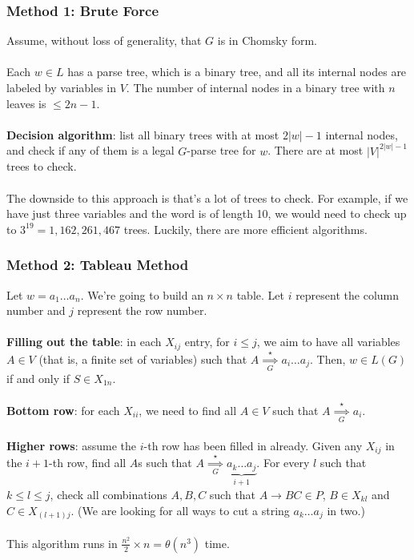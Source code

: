 \documentclass[]{article}
\theoremstyle{definition}
\begin{document}
        \subsubsection{Method 1: Brute Force}
          Assume, without loss of generality, that $G$ is in Chomsky form.
          \\ \\
          Each $w \in L$ has a parse tree, which is a binary tree, and all its internal nodes are labeled by variables in $V$. The number of internal nodes in a binary tree with $n$ leaves is $\le 2n - 1$.
          \\ \\
          \textbf{Decision algorithm}: list all binary trees with at most $2|w| - 1$ internal nodes, and check if any of them is a legal $G$-parse tree for $w$. There are at most $|V|^{2|w| - 1}$ trees to check.
          \\ \\
          The downside to this approach is that's a lot of trees to check. For example, if we have just three variables and the word is of length 10, we would need to check up to $3^{19} = 1,162,261,467$ trees. Luckily, there are more efficient algorithms.

        \subsubsection{Method 2: Tableau Method}
          Let $w = a_1 \ldots a_n$. We're going to build an $n \times n$ table. Let $i$ represent the column number and $j$ represent the row number.
          \\ \\
          \textbf{Filling out the table}: in each $X_{ij}$ entry, for $i \le j$, we aim to have all variables $A \in V$ (that is, a finite set of variables) such that $A \underset{G}{\overset{\star}{\implies}} a_i \ldots a_j$. Then, $w \in L(G)$ if and only if $S \in X_{1n}$.
          \\ \\
          \textbf{Bottom row}: for each $X_{ii}$, we need to find all $A \in V$ such that $A \underset{G}{\overset{\star}{\implies}} a_i$.
          \\ \\
          \textbf{Higher rows}: assume the $i$-th row has been filled in already. Given any $X_{ij}$ in the $i+1$-th row, find all $A$s such that $A \underset{G}{\overset{\star}{\implies}} \underbrace{a_k \ldots a_j}_{i + 1}$. For every $l$ such that $k \le l \le j$, check all combinations $A, B, C$ such that $A \to BC \in P$, $B \in X_{kl}$ and $C \in X_{(l + 1)j}$. (We are looking for all ways to cut a string $a_k \ldots a_j$ in two.)
          \\ \\
          This algorithm runs in $\frac{n^2}{2} \times n = \theta(n^3)$ time.
\end{document}
